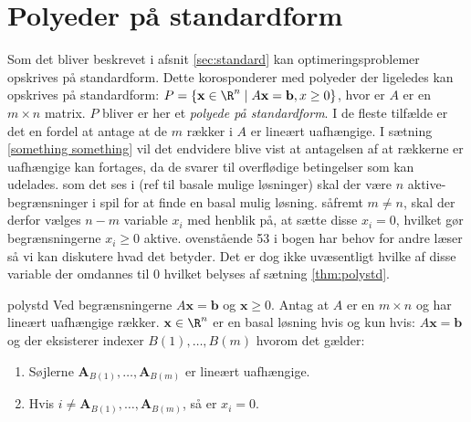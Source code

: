 \section{Polyeder på standardform}
\label{afsnit:fisk}
%
Som det bliver beskrevet i afsnit \ref{sec:standard} kan optimeringsproblemer opskrives på standardform.
Dette korosponderer med polyeder der ligeledes kan opskrives på standardform: 
$P=\{ \mathbf{x} \in \R^n \mid A\mathbf{x}=\mathbf{b},x \geq 0 \}$, hvor er $A$ er en $m \times n$ matrix.
$P$ bliver er her et \textit{polyede på standardform}.
I de fleste tilfælde er det en fordel at antage at de $m$ rækker i $A$ er lineært uafhængige.
I sætning \ref{something something} vil det endvidere blive vist at antagelsen af at rækkerne er uafhængige kan fortages, da de svarer til overflødige betingelser som kan udelades.
som det ses i (ref til basale mulige løsninger) skal der være $n$ aktive-begrænsninger i spil for at finde en basal mulig løsning.
såfremt $m \neq n$, skal der derfor vælges $n-m$ variable $x_i$ med henblik på, at sætte disse $x_i=0$, hvilket gør begrænsningerne $x_i \geq 0$ aktive.
ovenstående 53 i bogen har behov for andre læser så vi kan diskutere hvad det betyder.
Det er dog ikke uvæsentligt hvilke af disse variable der omdannes til $0$ hvilket belyses af sætning \ref{thm:polystd}.
\begin{thm}{}{polystd}
Ved begrænsningerne $A\mathbf{x}=\mathbf{b}$ og $\mathbf{x}\geq 0$.
Antag at $A$ er en $m \times n$ og har lineært uafhængige rækker.
$\mathbf{x} \in \R^n$ er en basal løsning hvis og kun hvis: $A\mathbf{x}=\mathbf{b}$ og der eksisterer indexer $B(1),\ldots,B(m)$ hvorom det gælder:
\begin{enumerate}[label=(\alph*)]
\item Søjlerne $\mathbf{A}_{B(1)},\ldots,\mathbf{A}_{B(m)}$ er lineært uafhængige.
\item Hvis $i \neq \mathbf{A}_{B(1)},\ldots,\mathbf{A}_{B(m)}$, så er $x_i=0$.
\end{enumerate}
\end{thm}
